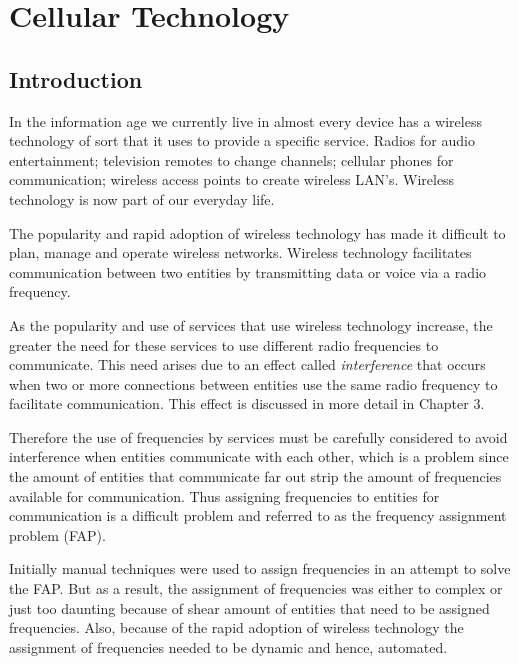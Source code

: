 \chapter{Cellular Technology}
\label{chpt:celltech}
\section{Introduction}
In the information age we currently live in almost every device has a wireless technology of sort that it uses to provide a specific service. Radios for audio entertainment; television remotes to change channels; cellular phones for communication; wireless access points to create wireless LAN's\cite{Karen2004}. Wireless technology is now part of our everyday life.

The popularity and rapid adoption of wireless technology has made it difficult to plan, manage and operate wireless networks\cite{Karen2004,Eisenblatter,GSMArchitectureProtocolsServices,GSM92,wirelesstelcoMullet}. Wireless technology facilitates communication between two entities by transmitting data or voice via a radio frequency\cite{Karen2004,Eisenblatter,GSMArchitectureProtocolsServices,GSM92,wirelesstelcoMullet}. 

As the popularity and use of services that use wireless technology increase, the greater the need for these services to use different radio frequencies to communicate\cite{Karen2004,Eisenblatter,GSMArchitectureProtocolsServices,GSM92,wirelesstelcoMullet}. This need arises due to an effect called \emph{interference} that occurs when two or more connections between entities use the same radio frequency to facilitate communication\cite{Karen2004,Eisenblatter,GSMArchitectureProtocolsServices,GSM92,wirelesstelcoMullet}. This effect is discussed in more detail in Chapter 3.

Therefore the use of frequencies by services must be carefully considered to avoid interference when entities communicate with each other, which is a problem since the amount of entities that communicate far out strip the amount of frequencies available for communication\cite{Karen2004,Eisenblatter,GSMArchitectureProtocolsServices,GSM92,wirelesstelcoMullet}. Thus assigning frequencies to entities for communication is a difficult problem and referred to as the frequency assignment problem (FAP)\cite{Karen2004,Eisenblatter,GSMArchitectureProtocolsServices,GSM92,wirelesstelcoMullet}.

Initially manual techniques were used to assign frequencies in an attempt to solve the FAP\cite{Karen2004,Eisenblatter,GSMArchitectureProtocolsServices,GSM92,wirelesstelcoMullet}. But as a result, the assignment of frequencies was either to complex or just too daunting because of shear amount of entities that need to be assigned frequencies\cite{Karen2004,Eisenblatter,GSMArchitectureProtocolsServices,GSM92,wirelesstelcoMullet}. Also, because of the rapid adoption of wireless technology the assignment of frequencies needed to be dynamic and hence, automated\cite{Karen2004,Eisenblatter,GSMArchitectureProtocolsServices,GSM92,wirelesstelcoMullet}.

